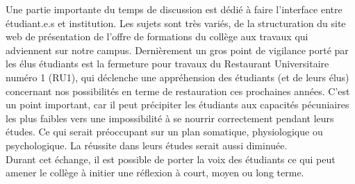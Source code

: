 \documentclass{article}
\begin{document}
Une partie importante du temps de discussion est dédié à faire l'interface entre étudiant.e.s et institution. 
Les sujets sont très variés, de la structuration du site web de présentation de l'offre de formations du collège aux travaux qui adviennent sur notre campus. 
Dernièrement un gros point de vigilance porté par les élus étudiants est la fermeture pour travaux du Restaurant Universitaire numéro 1 (RU1), qui déclenche une appréhension des étudiants (et de leurs élus) concernant nos possibilités en terme de restauration ces prochaines années.
C'est un point important, car il peut précipiter les étudiants aux capacités pécuniaires les plus faibles vers une impossibilité à se nourrir correctement pendant leurs études. 
Ce qui serait préoccupant sur un plan somatique, physiologique ou psychologique. 
La réussite dans leurs études serait aussi diminuée. \\ 
Durant cet échange, il est possible de porter la voix des étudiants ce qui peut amener le collège à initier une réflexion à court, moyen ou long terme.
\end{document}

